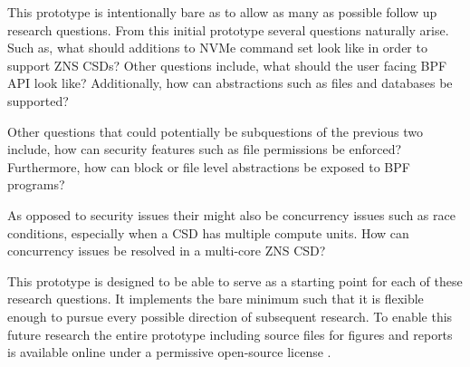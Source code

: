 \documentclass[conference]{IEEEtran}
\newcommand\bashstyle{
	\lstset{
		language=Bash,
		basicstyle=\ttm,
		showstringspaces=false,
		tabsize=2,
		aboveskip=0.2cm,
		belowskip=0.2cm,
		prebreak=\textbackslash,
		extendedchars=true,
		mathescape=false,
		linewidth=8.85cm,
		breaklines=true
	}
}
\newcommand\bashexternal[2][]{{\bashstyle}}
\newcommand\cstyle{
	\lstset{
		language=c,
		basicstyle=\ttm,
		showstringspaces=false,
		tabsize=4,
		aboveskip=0.2cm,
		belowskip=0.2cm,
		otherkeywords={self},             %
		keywordstyle=\ttb\color{deepblue},
		emph={MyClass,__init__},          %
		emphstyle=\ttb\color{deepred},    %
		stringstyle=\color{deepgreen},
		frame=tb,                          %
		prebreak=\textbackslash,
		linewidth=8.85cm,
		breaklines=true,
	}
}
\newcommand\cexternal[2][]{{\cstyle}}
\begin{document}
This prototype is intentionally bare as to allow as many as possible follow up
research questions. From this initial prototype several questions naturally
arise. Such as, what should additions to NVMe command set look like in order to
support ZNS CSDs? Other questions include, what should the user facing BPF API
look like? Additionally, how can abstractions such as files and databases be
supported?

Other questions that could potentially be subquestions of the previous two
include, how can security features such as file permissions be enforced?
Furthermore, how can block or file level abstractions be exposed to BPF
programs?

As opposed to security issues their might also be concurrency issues such as
race conditions, especially when a CSD has multiple compute units. How can
concurrency issues be resolved in a multi-core ZNS CSD?

This prototype is designed to be able to serve as a starting point for each
of these research questions. It implements the bare minimum such that it is
flexible enough to pursue every possible direction of subsequent research. To
enable this future research the entire prototype including source files for
figures and reports is available online under a permissive open-source license
\cite{qemu-csd}.

%


\end{document}
